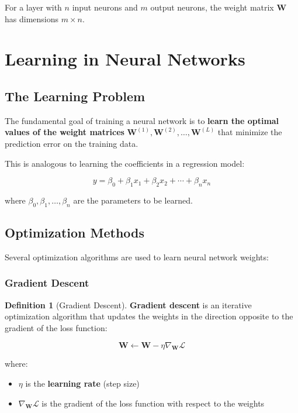 \documentclass[11pt,a4paper]{article}
\theoremstyle{definition}
\newtheorem{definition}{Definition}[section]
\theoremstyle{plain}
\theoremstyle{remark}
\begin{document}
For a layer with $n$ input neurons and $m$ output neurons, the weight matrix $\mathbf{W}$ has dimensions $m \times n$.



\section{Learning in Neural Networks}

\subsection{The Learning Problem}

\begin{tcolorbox}[colback=orange!5!white,colframe=orange!75!black,title=\textbf{Objective: Learning the Weights}]
The fundamental goal of training a neural network is to \textbf{learn the optimal values of the weight matrices} $\mathbf{W}^{(1)}, \mathbf{W}^{(2)}, \dots, \mathbf{W}^{(L)}$ that minimize the prediction error on the training data.
\end{tcolorbox}

This is analogous to learning the coefficients in a regression model:

\[
y = \beta_0 + \beta_1 x_1 + \beta_2 x_2 + \cdots + \beta_n x_n
\]

where $\beta_0, \beta_1, \dots, \beta_n$ are the parameters to be learned.

\subsection{Optimization Methods}

Several optimization algorithms are used to learn neural network weights:

\subsubsection{Gradient Descent}

\begin{definition}[Gradient Descent]
\textbf{Gradient descent} is an iterative optimization algorithm that updates the weights in the direction opposite to the gradient of the loss function:

\[
\mathbf{W} \leftarrow \mathbf{W} - \eta \nabla_{\mathbf{W}} \mathcal{L}
\]

where:
\begin{itemize}
    \item $\eta$ is the \textbf{learning rate} (step size)
    \item $\nabla_{\mathbf{W}} \mathcal{L}$ is the gradient of the loss function with respect to the weights
\end{itemize}
\end{definition}
\end{document}
